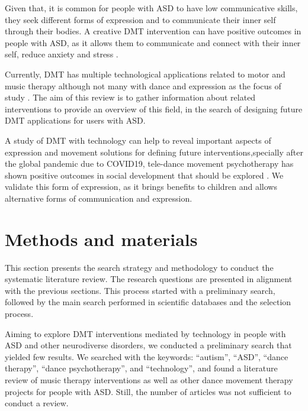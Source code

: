 \documentclass[a4paper,fleqn]{cas-sc}
\begin{document}
Given that, it is common for people with ASD to have low communicative skills, they seek different forms of expression and to communicate their inner self through their bodies. A creative DMT intervention can have positive outcomes in people with ASD, as it allows them to communicate and connect with their inner self,  reduce anxiety and stress \cite{Martin18}.



Currently, DMT has multiple technological applications related to motor and music therapy although not many with dance and expression as the focus of study \cite{Ragone21}. The aim of this review is to gather information about related interventions to provide an overview of this field, in the search of designing future DMT applications for users with ASD.

A study of DMT with technology can help to reveal important aspects of expression and movement solutions for defining future interventions,specially after the global pandemic due to COVID19, tele-dance movement psychotherapy has shown positive outcomes in social development that should be explored \cite{Moo23, Araya2024}. We validate this form of expression, as it brings benefits to children and allows alternative forms of communication and expression.


\section{Methods and materials} %
\label{sec3:methods}
This section presents the search strategy and methodology to conduct the systematic literature review. The research questions are presented in alignment with the previous sections. This process started with a preliminary search, followed by the main search performed in scientific databases and the selection process.

Aiming to explore DMT interventions mediated by technology in people with ASD and other neurodiverse disorders, we conducted a preliminary search that yielded few results. We searched with the keywords: ``autism'', ``ASD'', ``dance therapy'', ``dance psychotherapy'', and ``technology'', and found a literature review of music therapy interventions as well as other dance movement therapy projects for people with ASD. Still, the number of articles was not sufficient to conduct a review. 
\end{document}
